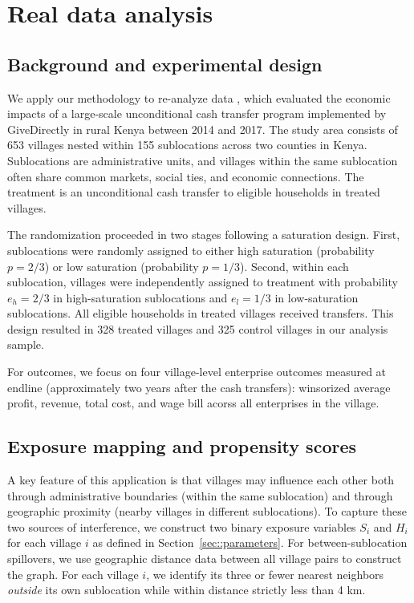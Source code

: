 \documentclass{article}
\begin{document}
\section{Real data analysis}

\subsection{Background and experimental design}

We apply our methodology to re-analyze data  \citet{egger2022general}, which evaluated the economic impacts of a large-scale unconditional cash transfer program implemented by GiveDirectly in rural Kenya between 2014 and 2017. The study area consists of 653 villages nested within 155 sublocations across two counties in Kenya. Sublocations are administrative units, and villages within the same sublocation often share common markets, social ties, and economic connections. The treatment is an unconditional cash transfer to eligible households in treated villages.

The randomization proceeded in two stages following a saturation design. First, sublocations were randomly assigned to either high saturation (probability $p = 2/3$) or low saturation (probability $p = 1/3$). Second, within each sublocation, villages were independently assigned to treatment with probability $e_h = 2/3$ in high-saturation sublocations and $e_l = 1/3$ in low-saturation sublocations. All eligible households in treated villages received transfers. This design resulted in 328 treated villages and 325 control villages in our analysis sample.

For outcomes, we focus on four village-level enterprise outcomes measured at endline (approximately two years after the cash transfers): winsorized average profit, revenue, total cost, and wage bill acorss all enterprises in the village.

\subsection{Exposure mapping and propensity scores}

A key feature of this application is that villages may influence each other both through administrative boundaries (within the same sublocation) and through geographic proximity (nearby villages in different sublocations). To capture these two sources of interference, we construct two binary exposure variables $S_i$ and $H_i$ for each village $i$ as defined in Section~\ref{sec::parameters}. For between-sublocation spillovers, we use geographic distance data between all village pairs to construct the graph. For each village $i$, we identify its three or fewer nearest neighbors \textit{outside} its own sublocation while within distance strictly less than 4 km.
\end{document}
